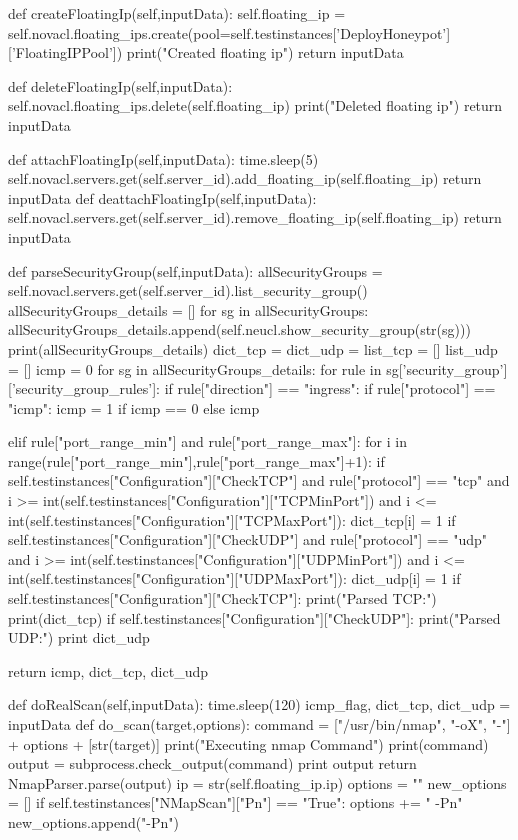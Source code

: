 \begin{python}
	def createFloatingIp(self,inputData):
		self.floating_ip = self.novacl.floating_ips.create(pool=self.testinstances['DeployHoneypot']['FloatingIPPool'])
		print("Created floating ip")
		return inputData

	def deleteFloatingIp(self,inputData):
		self.novacl.floating_ips.delete(self.floating_ip)
		print("Deleted floating ip")
		return inputData


	def attachFloatingIp(self,inputData):
		time.sleep(5)
		self.novacl.servers.get(self.server_id).add_floating_ip(self.floating_ip)
		return inputData
	def deattachFloatingIp(self,inputData):
		self.novacl.servers.get(self.server_id).remove_floating_ip(self.floating_ip)
		return inputData

	def parseSecurityGroup(self,inputData):
		allSecurityGroups = self.novacl.servers.get(self.server_id).list_security_group()
		allSecurityGroups_details = []
		for sg in allSecurityGroups:
			allSecurityGroups_details.append(self.neucl.show_security_group(str(sg)))
		print(allSecurityGroups_details)
		dict_tcp = {}
		dict_udp = {}
		list_tcp = []
		list_udp = []
		icmp = 0
		for sg in allSecurityGroups_details:
			for rule in sg['security_group']['security_group_rules']:
				if rule["direction"] == "ingress":
					if rule["protocol"] == "icmp":
						icmp = 1 if icmp == 0 else icmp
					
					elif rule["port_range_min"] and rule["port_range_max"]:
						for i in range(rule["port_range_min"],rule["port_range_max"]+1):
							if self.testinstances["Configuration"]["CheckTCP"] and rule["protocol"] == "tcp" and i >= int(self.testinstances["Configuration"]["TCPMinPort"]) and i <= int(self.testinstances["Configuration"]["TCPMaxPort"]):
								dict_tcp[i] = 1
							if self.testinstances["Configuration"]["CheckUDP"] and rule["protocol"] == "udp" and i >= int(self.testinstances["Configuration"]["UDPMinPort"]) and i <= int(self.testinstances["Configuration"]["UDPMaxPort"]):	
								dict_udp[i] = 1
		if self.testinstances["Configuration"]["CheckTCP"]:
			print("Parsed TCP:")
			print(dict_tcp)
		if self.testinstances["Configuration"]["CheckUDP"]:
			print("Parsed UDP:")
			print dict_udp

		return icmp, dict_tcp, dict_udp

	def doRealScan(self,inputData):
		time.sleep(120)
		icmp_flag, dict_tcp, dict_udp = inputData
		def do_scan(target,options):
			command = ["/usr/bin/nmap", "-oX", "-"] + options + [str(target)]
			print("Executing nmap Command")
			print(command)
			output = subprocess.check_output(command)
			print output
			return NmapParser.parse(output)
		ip = str(self.floating_ip.ip)
		options = ""
		new_options = []
		if self.testinstances["NMapScan"]["Pn"] == "True":
			options += " -Pn"
			new_options.append("-Pn")


\end{python}
